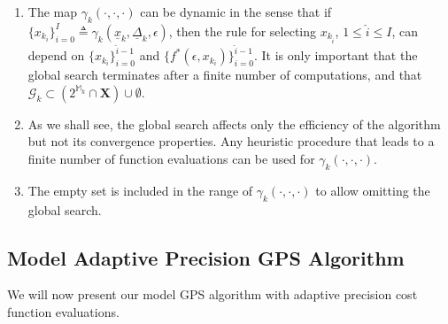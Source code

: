 \vspace{-\baselineskip}
\begin{remark}~\\
\\[-2.5\baselineskip] {\em
\begin{enumerate}
\item
The map $\gamma_k(\cdot, \cdot, \cdot)$ 
can be dynamic in the sense that if $\{ x_{k_i} \}_{i=0}^I \triangleq 
\gamma_k(\underline x_k, \underline \Delta_k, \epsilon)$, 
then the rule for selecting
$x_{k_{\widehat i}}$, $1 \le \widehat i \le I$, can depend on 
$\{ x_{k_i} \}_{i=0}^{\widehat i - 1}$ and
$\{ f^*(\epsilon, x_{k_i}) \}_{i=0}^{\widehat i - 1}$. 
It is only important that the global search terminates after 
a finite number of computations, and that  
$\mathcal G_k \subset (2^{\mathbb M_k} \cap \mathbf X) \cup \emptyset$.
\item
As we shall see, the global search affects only the efficiency of the
algorithm but not its convergence properties. Any heuristic procedure
that leads to a finite number of function evaluations can be used
for $\gamma_k(\cdot, \cdot, \cdot)$. 
\item
The empty set is included in the range of $\gamma_k(\cdot, \cdot, \cdot)$ 
to allow omitting the global search.
\end{enumerate}
\rbox
}
\end{remark}

\subsection{Model Adaptive Precision GPS Algorithm}
We will now present our model GPS algorithm
with adaptive precision cost function evaluations.\\

